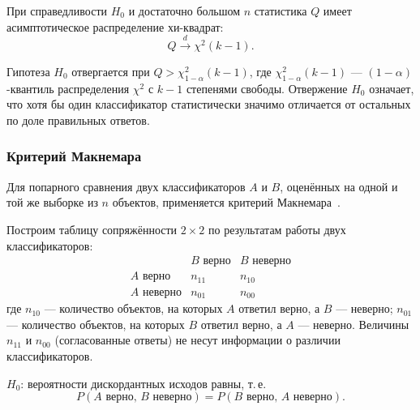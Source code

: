 При справедливости $H_0$ и достаточно большом $n$ статистика $Q$ имеет
асимптотическое распределение хи-квадрат:
\begin{equation}
    Q \xrightarrow{d} \chi^{2}(k - 1).
    \label{eq:cochran-distribution}
\end{equation}

Гипотеза $H_0$ отвергается при $Q > \chi^{2}_{1-\alpha}(k-1)$, где
$\chi^{2}_{1-\alpha}(k-1)$ --- $(1-\alpha)$-квантиль распределения
$\chi^{2}$ с $k-1$ степенями свободы. Отвержение $H_0$ означает, что
хотя бы один классификатор статистически значимо отличается от остальных
по доле правильных ответов.

\subsubsection{Критерий Макнемара}
\label{subsubsec:mcnemar}

Для попарного сравнения двух классификаторов $A$ и $B$, оценённых на
одной и той же выборке из $n$ объектов, применяется критерий
Макнемара~\cite{mcnemar1947note, dietterich1998approximate}.

Построим таблицу сопряжённости $2 \times 2$ по результатам работы
двух классификаторов:
\begin{equation}
    \begin{array}{c|cc}
          & B \text{ верно} & B \text{ неверно} \\ \hline
    A \text{ верно}   & n_{11} & n_{10} \\
    A \text{ неверно} & n_{01} & n_{00}
    \end{array}
    \label{eq:mcnemar-table}
\end{equation}
где $n_{10}$ --- количество объектов, на которых $A$ ответил верно,
а $B$ --- неверно; $n_{01}$ --- количество объектов, на которых $B$
ответил верно, а $A$ --- неверно. Величины $n_{11}$ и $n_{00}$
(согласованные ответы) не несут информации о различии классификаторов.

\begin{definition}
\label{def:mcnemar-h0}
$H_0$: вероятности дискордантных исходов равны, т.\,е.
\begin{equation}
    P(\text{$A$ верно, $B$ неверно}) = P(\text{$B$ верно, $A$ неверно}).
    \label{eq:mcnemar-h0}
\end{equation}
\end{definition}

